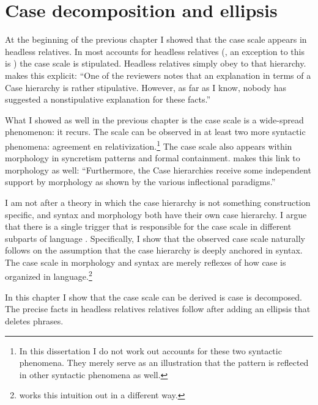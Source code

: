 
\chapter{Case decomposition and ellipsis}

At the beginning of the previous chapter I showed that the case scale  appears in headless relatives. In most accounts for headless relatives (\citealt[cf.][]{pittner1995,vogel2001,grosu2003,harbert1978}, an exception to this is \citealt{himmelreich2017}) the case scale is stipulated. Headless relatives simply obey to that hierarchy.  makes this explicit: ``One of the reviewers notes that an explanation in terms of a Case hierarchy is rather stipulative. However, as far as I know, nobody has suggested a nonstipulative explanation for these facts.''

What I showed as well in the previous chapter is the case scale  is a wide-spread phenomenon: it recurs. The scale can be observed in at least two more syntactic phenomena: agreement en relativization.\footnote{
In this dissertation I do not work out accounts for these two syntactic phenomena. They merely serve as an illustration that the pattern is reflected in other syntactic phenomena as well.}
The case scale also appears within morphology in syncretism patterns and formal containment.  makes this link to morphology as well: ``Furthermore, the Case hierarchies receive some independent support by morphology as shown by the various inflectional paradigms.''

I am not after a theory in which the case hierarchy is not something construction specific, and syntax and morphology both have their own case hierarchy. I argue that there is a single trigger that is responsible for the case scale in different subparts of language \citep[cf.][on numeral constructions]{caha2019}. Specifically, I show that the observed case scale naturally follows on the assumption that the case hierarchy is deeply anchored in syntax. The case scale in morphology and syntax are merely reflexes of how case is organized in language.\footnote{
\citet{himmelreich2017} works this intuition out in a different way.
}

In this chapter I show that the case scale can be derived is case is decomposed. The precise facts in headless relatives relatives follow after adding an ellipsis that deletes phrases.


